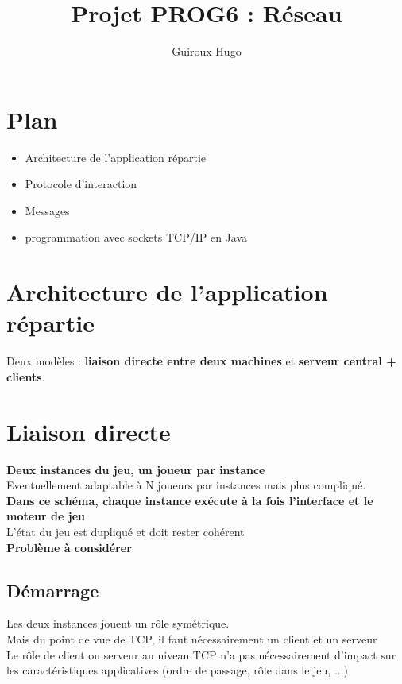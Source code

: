 \documentclass{article}
\title{Projet PROG6 : Réseau}
\author{Guiroux Hugo}
\let\maketitlebis\maketitle
\renewcommand\maketitle{\maketitlebis \thispagestyle{fancy}}
\begin{document}
\maketitle

\section{Plan}
\begin{itemize}
\item Architecture de l'application répartie
\item Protocole d'interaction
\item Messages
\item programmation avec sockets TCP/IP en Java
\end{itemize}

\section{Architecture de l'application répartie}
Deux modèles : \textbf{liaison directe entre deux machines} et \textbf{serveur central + clients}.
\section{Liaison directe}
\textbf{Deux instances du jeu, un joueur par instance}\\
Eventuellement adaptable à N joueurs par instances mais plus compliqué.\\
\textbf{Dans ce schéma, chaque instance exécute à la fois l'interface et le moteur de jeu}\\
L'état du jeu est dupliqué et doit rester cohérent\\
\textbf{Problème à considérer}\\
\subsection{Démarrage}
Les deux instances jouent un rôle symétrique.\\
Mais du point de vue de TCP, il faut nécessairement un client et un serveur\\
Le rôle de client ou serveur au niveau TCP n'a pas nécessairement d'impact sur les caractéristiques applicatives (ordre de passage, rôle dans le jeu, ...)\\
\end{document}
